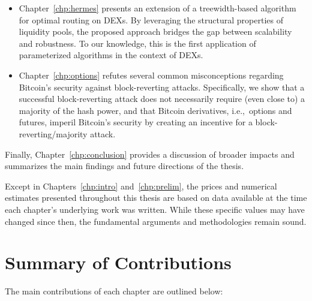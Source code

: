 \begin{itemize}
    \item Chapter~\ref{chp:hermes} presents an extension of a treewidth-based algorithm for optimal routing on DEXs. By leveraging the structural properties of liquidity pools, the proposed approach bridges the gap between scalability and robustness. To our knowledge, this is the first application of parameterized algorithms in the context of DEXs.
    
    \item Chapter~\ref{chp:options} refutes several common misconceptions regarding Bitcoin's security against block-reverting attacks. Specifically, we show that a successful block-reverting attack does not necessarily require (even close to) a majority of the hash power, and that Bitcoin derivatives, i.e.,~options and futures, imperil Bitcoin's security by creating an incentive for a block-reverting/majority attack.
\end{itemize}


Finally, Chapter~\ref{chp:conclusion} provides a discussion of broader impacts and summarizes the main findings and future directions of the thesis.

 Except in Chapters~\ref{chp:intro} and~\ref{chp:prelim}, the prices and numerical estimates presented throughout this thesis are based on data available at the time each chapter's underlying work was written. While these specific values may have changed since then, the fundamental arguments and methodologies remain sound.


\section{Summary of Contributions}
The main contributions of each chapter are outlined below:

